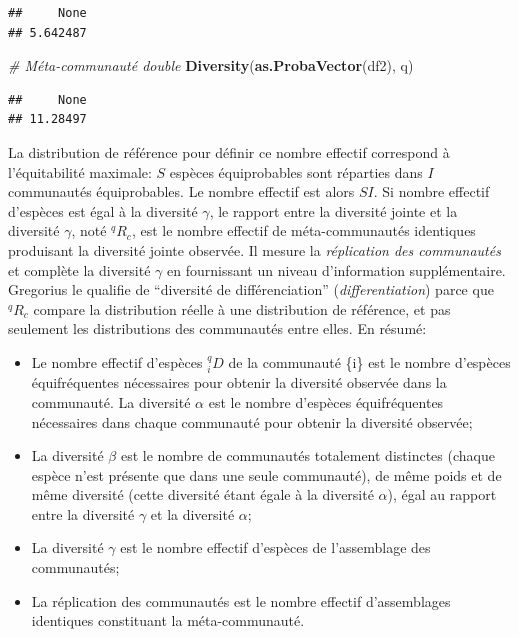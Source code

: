 \documentclass[
  11pt,
  french,
  a4paper,
  extrafontsizes,onecolumn,openright
  ]{memoir}
\newenvironment{Shaded}{\begin{snugshade}}{\end{snugshade}}
\newcommand{\CommentTok}[1]{\textcolor[rgb]{0.56,0.35,0.01}{\textit{#1}}}
\newcommand{\KeywordTok}[1]{\textcolor[rgb]{0.13,0.29,0.53}{\textbf{#1}}}
\newcommand{\NormalTok}[1]{#1}
\providecommand{\tightlist}{%
  \setlength{\itemsep}{0pt}\setlength{\parskip}{0pt}}
\begin{document}
\begin{verbatim}
##     None 
## 5.642487
\end{verbatim}

\begin{Shaded}
\begin{Highlighting}[]
\CommentTok{# Méta-communauté double}
\KeywordTok{Diversity}\NormalTok{(}\KeywordTok{as.ProbaVector}\NormalTok{(df2), q)}
\end{Highlighting}
\end{Shaded}

\begin{verbatim}
##     None 
## 11.28497
\end{verbatim}

\normalsize

La distribution de référence pour définir ce nombre effectif correspond à l'équitabilité maximale: \(S\) espèces équiprobables sont réparties dans \(I\) communautés équiprobables.
Le nombre effectif est alors \(SI\).
Si nombre effectif d'espèces est égal à la diversité \(\gamma\), le rapport entre la diversité jointe et la diversité \(\gamma\), noté \(^{q}\!R_{c}\), est le nombre effectif de méta-communautés identiques produisant la diversité jointe observée.
Il mesure la \emph{réplication des communautés} et complète la diversité \(\gamma\) en fournissant un niveau d'information supplémentaire.
Gregorius le qualifie de \enquote{diversité de différenciation} (\emph{differentiation}) parce que \(^{q}\!R_{c}\) compare la distribution réelle à une distribution de référence, et pas seulement les distributions des communautés entre elles.
En résumé:

\begin{itemize}
\tightlist
\item
  Le nombre effectif d'espèces \(^{q}_{i}\!D\) de la communauté \{i\} est le nombre d'espèces équifréquentes nécessaires pour obtenir la diversité observée dans la communauté.
  La diversité \(\alpha\) est le nombre d'espèces équifréquentes nécessaires dans chaque communauté pour obtenir la diversité observée;
\item
  La diversité \(\beta\) est le nombre de communautés totalement distinctes (chaque espèce n'est présente que dans une seule communauté), de même poids et de même diversité (cette diversité étant égale à la diversité \(\alpha\)), égal au rapport entre la diversité \(\gamma\) et la diversité \(\alpha\);
\item
  La diversité \(\gamma\) est le nombre effectif d'espèces de l'assemblage des communautés;
\item
  La réplication des communautés est le nombre effectif d'assemblages identiques constituant la méta-communauté.
\end{itemize}
\end{document}
